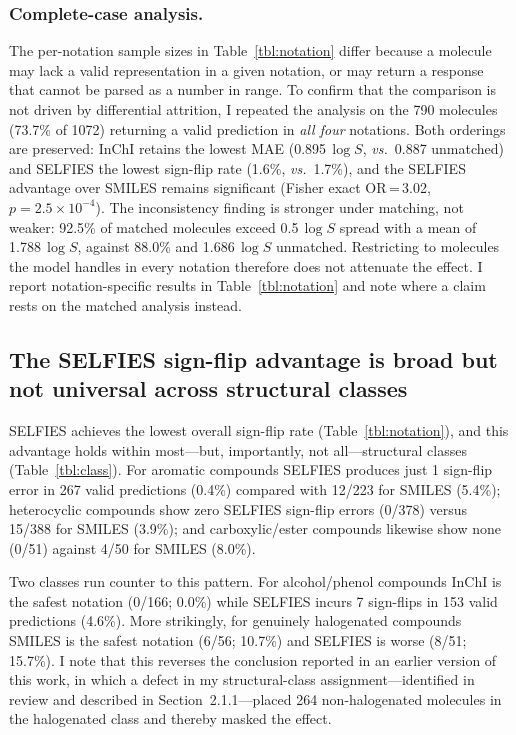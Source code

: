 \documentclass[twoside,twocolumn,9pt]{article}
\newcommand{\logS}{\ensuremath{\log S}}
\begin{document}
\subsubsection{Complete-case analysis.~~} The per-notation sample sizes in Table~\ref{tbl:notation} differ because a molecule may lack a valid representation in a given notation, or may return a response that cannot be parsed as a number in range. To confirm that the comparison is not driven by differential attrition, I repeated the analysis on the 790 molecules (73.7\% of 1072) returning a valid prediction in \textit{all four} notations. Both orderings are preserved: InChI retains the lowest MAE (0.895\,$\logS$, \textit{vs.}\ 0.887 unmatched) and SELFIES the lowest sign-flip rate (1.6\%, \textit{vs.}\ 1.7\%), and the SELFIES advantage over SMILES remains significant (Fisher exact OR\,=\,3.02, $p=2.5\!\times\!10^{-4}$). The inconsistency finding is stronger under matching, not weaker: 92.5\% of matched molecules exceed 0.5\,$\logS$ spread with a mean of 1.788\,$\logS$, against 88.0\% and 1.686\,$\logS$ unmatched. Restricting to molecules the model handles in every notation therefore does not attenuate the effect. I report notation-specific results in Table~\ref{tbl:notation} and note where a claim rests on the matched analysis instead.

\subsection{The SELFIES sign-flip advantage is broad but not universal across structural classes}
\label{sec:selfies}

SELFIES achieves the lowest overall sign-flip rate (Table~\ref{tbl:notation}), and this advantage holds within most---but, importantly, not all---structural classes (Table~\ref{tbl:class}). For aromatic compounds SELFIES produces just 1 sign-flip error in 267 valid predictions (0.4\%) compared with 12/223 for SMILES (5.4\%); heterocyclic compounds show zero SELFIES sign-flip errors (0/378) versus 15/388 for SMILES (3.9\%); and carboxylic/ester compounds likewise show none (0/51) against 4/50 for SMILES (8.0\%).

Two classes run counter to this pattern. For alcohol/phenol compounds InChI is the safest notation (0/166; 0.0\%) while SELFIES incurs 7 sign-flips in 153 valid predictions (4.6\%). More strikingly, for genuinely halogenated compounds SMILES is the safest notation (6/56; 10.7\%) and SELFIES is worse (8/51; 15.7\%). I note that this reverses the conclusion reported in an earlier version of this work, in which a defect in my structural-class assignment---identified in review and described in Section~2.1.1---placed 264 non-halogenated molecules in the halogenated class and thereby masked the effect.
\end{document}
